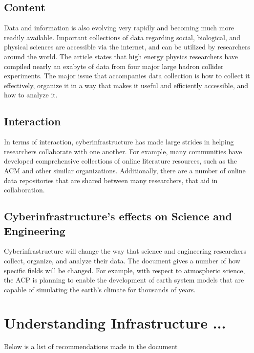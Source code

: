 \documentclass[11pt]{article}
\begin{document}
\subsection{Content}
Data and information is also evolving very rapidly and becoming much more readily available.  Important collections of data regarding social, biological, and physical sciences are accessible via the internet, and can be utilized by researchers around the world.  The article states that high energy physics researchers have compiled nearly an exabyte of data from four major large hadron collider experiments.  The major issue that accompanies data collection is how to collect it effectively, organize it in a way that makes it useful and efficiently accessible, and how to analyze it.

\subsection{Interaction}
In terms of interaction, cyberinfrastructure has made large strides in helping researchers collaborate with one another.  For example, many communities have developed comprehensive collections of online literature resources, such as the ACM and other similar organizations.  Additionally, there are a number of online data repositories that are shared between many researchers, that aid in collaboration.  

\subsection{Cyberinfrastructure's effects on Science and Engineering}
Cyberinfrastructure will change the way that science and engineering researchers collect, organize, and analyze their data.  The document gives a number of how specific fields will be changed.  For example, with respect to atmospheric science, the ACP is planning to enable the development of earth system models that are capable of simulating the earth's climate for thousands of years.  

\newpage
\section{Understanding Infrastructure ...}
Below is a list of recommendations made in the document
\end{document}

